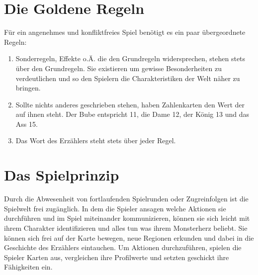 \section{Die Goldene Regeln}
    Für ein angenehmes und konfliktfreies Spiel benötigt es ein paar übergeordnete Regeln:
    \begin{enumerate}
         \item Sonderregeln, Effekte o.Ä. die den Grundregeln widersprechen, stehen stets über den Grundregeln. Sie existieren um gewisse Besonderheiten zu verdeutlichen und so den Spielern die Charakteristiken der Welt näher zu bringen.
         \item Sollte nichts anderes geschrieben stehen, haben Zahlenkarten den Wert der auf ihnen steht. Der Bube entspricht 11, die Dame 12, der König 13 und das Ass 15.
         \item Das Wort des Erzählers steht stets über jeder Regel.
    \end{enumerate}

    
\section{Das Spielprinzip}
    Durch die Abwesenheit von fortlaufenden Spielrunden oder Zugreinfolgen ist die Spielwelt frei zugänglich. In dem die Spieler ansagen welche Aktionen sie durchführen und im Spiel miteinander kommunizieren, können sie sich leicht mit ihrem Charakter identifizieren und alles tun was ihrem Monsterherz beliebt. Sie können sich frei auf der Karte bewegen, neue Regionen erkunden und dabei in die Geschichte des Erzählers eintauchen. Um Aktionen durchzuführen, spielen die Spieler Karten aus, vergleichen ihre Profilwerte und setzten geschickt ihre Fähigkeiten ein.
    

